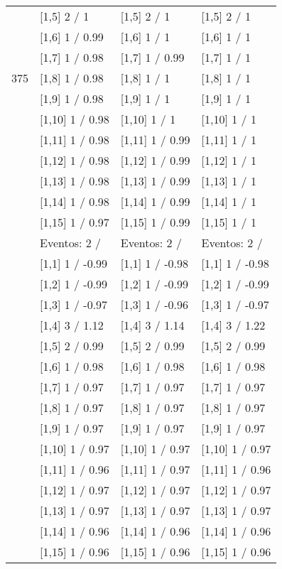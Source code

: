 \begin{table}
\begin{tabular}[t]{llll}
 & {}[1,5] 2  / 1 & {}[1,5] 2  / 1 & {}[1,5] 2  / 1\\
 & {}[1,6] 1  / 0.99 & {}[1,6] 1  / 1 & {}[1,6] 1  / 1\\
 & {}[1,7] 1  / 0.98 & {}[1,7] 1  / 0.99 & {}[1,7] 1  / 1\\
375 & {}[1,8] 1  / 0.98 & {}[1,8] 1  / 1 & {}[1,8] 1  / 1\\
\addlinespace
 & {}[1,9] 1  / 0.98 & {}[1,9] 1  / 1 & {}[1,9] 1  / 1\\
 & {}[1,10] 1  / 0.98 & {}[1,10] 1  / 1 & {}[1,10] 1  / 1\\
 & {}[1,11] 1  / 0.98 & {}[1,11] 1  / 0.99 & {}[1,11] 1  / 1\\
 & {}[1,12] 1  / 0.98 & {}[1,12] 1  / 0.99 & {}[1,12] 1  / 1\\
 & {}[1,13] 1  / 0.98 & {}[1,13] 1  / 0.99 & {}[1,13] 1  / 1\\
\addlinespace
 & {}[1,14] 1  / 0.98 & {}[1,14] 1  / 0.99 & {}[1,14] 1  / 1\\
 & {}[1,15] 1  / 0.97 & {}[1,15] 1  / 0.99 & {}[1,15] 1  / 1\\
 & Eventos:  2 / & Eventos:  2 / & Eventos:  2 /\\
 & {}[1,1] 1  / -0.99 & {}[1,1] 1  / -0.98 & {}[1,1] 1  / -0.98\\
 & {}[1,2] 1  / -0.99 & {}[1,2] 1  / -0.99 & {}[1,2] 1  / -0.99\\
\addlinespace
 & {}[1,3] 1  / -0.97 & {}[1,3] 1  / -0.96 & {}[1,3] 1  / -0.97\\
 & {}[1,4] 3  / 1.12 & {}[1,4] 3  / 1.14 & {}[1,4] 3  / 1.22\\
 & {}[1,5] 2  / 0.99 & {}[1,5] 2  / 0.99 & {}[1,5] 2  / 0.99\\
 & {}[1,6] 1  / 0.98 & {}[1,6] 1  / 0.98 & {}[1,6] 1  / 0.98\\
 & {}[1,7] 1  / 0.97 & {}[1,7] 1  / 0.97 & {}[1,7] 1  / 0.97\\
\addlinespace
500 & {}[1,8] 1  / 0.97 & {}[1,8] 1  / 0.97 & {}[1,8] 1  / 0.97\\
 & {}[1,9] 1  / 0.97 & {}[1,9] 1  / 0.97 & {}[1,9] 1  / 0.97\\
 & {}[1,10] 1  / 0.97 & {}[1,10] 1  / 0.97 & {}[1,10] 1  / 0.97\\
 & {}[1,11] 1  / 0.96 & {}[1,11] 1  / 0.97 & {}[1,11] 1  / 0.96\\
 & {}[1,12] 1  / 0.97 & {}[1,12] 1  / 0.97 & {}[1,12] 1  / 0.97\\
\addlinespace
 & {}[1,13] 1  / 0.97 & {}[1,13] 1  / 0.97 & {}[1,13] 1  / 0.97\\
 & {}[1,14] 1  / 0.96 & {}[1,14] 1  / 0.96 & {}[1,14] 1  / 0.96\\
 & {}[1,15] 1  / 0.96 & {}[1,15] 1  / 0.96 & {}[1,15] 1  / 0.96\\
\bottomrule
\end{tabular}
\end{table}
